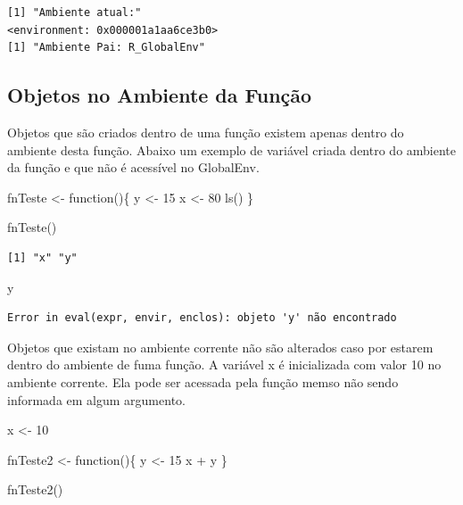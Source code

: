 \documentclass[
  letterpaper,
  DIV=11,
  numbers=noendperiod]{scrreprt}
\newenvironment{Shaded}{\begin{snugshade}}{\end{snugshade}}
\newcommand{\ControlFlowTok}[1]{\textcolor[rgb]{0.00,0.23,0.31}{#1}}
\newcommand{\DecValTok}[1]{\textcolor[rgb]{0.68,0.00,0.00}{#1}}
\newcommand{\FunctionTok}[1]{\textcolor[rgb]{0.28,0.35,0.67}{#1}}
\newcommand{\NormalTok}[1]{\textcolor[rgb]{0.00,0.23,0.31}{#1}}
\newcommand{\OtherTok}[1]{\textcolor[rgb]{0.00,0.23,0.31}{#1}}
\newcommand{\SpecialCharTok}[1]{\textcolor[rgb]{0.37,0.37,0.37}{#1}}
\begin{document}
\begin{verbatim}
[1] "Ambiente atual:"
<environment: 0x000001a1aa6ce3b0>
[1] "Ambiente Pai: R_GlobalEnv"
\end{verbatim}

\hypertarget{objetos-no-ambiente-da-funuxe7uxe3o}{%
\subsection{Objetos no Ambiente da
Função}\label{objetos-no-ambiente-da-funuxe7uxe3o}}

Objetos que são criados dentro de uma função existem apenas dentro do
ambiente desta função. Abaixo um exemplo de variável criada dentro do
ambiente da função e que não é acessível no GlobalEnv.

\begin{Shaded}
\begin{Highlighting}[]
\NormalTok{fnTeste }\OtherTok{\textless{}{-}} \ControlFlowTok{function}\NormalTok{()\{}
\NormalTok{  y }\OtherTok{\textless{}{-}} \DecValTok{15}
\NormalTok{  x }\OtherTok{\textless{}{-}} \DecValTok{80}
  \FunctionTok{ls}\NormalTok{()}
\NormalTok{\}}

\FunctionTok{fnTeste}\NormalTok{()}
\end{Highlighting}
\end{Shaded}

\begin{verbatim}
[1] "x" "y"
\end{verbatim}

\begin{Shaded}
\begin{Highlighting}[]
\NormalTok{y}
\end{Highlighting}
\end{Shaded}

\begin{verbatim}
Error in eval(expr, envir, enclos): objeto 'y' não encontrado
\end{verbatim}

Objetos que existam no ambiente corrente não são alterados caso por
estarem dentro do ambiente de fuma função. A variável x é inicializada
com valor 10 no ambiente corrente. Ela pode ser acessada pela função
memso não sendo informada em algum argumento.

\begin{Shaded}
\begin{Highlighting}[]
\NormalTok{x }\OtherTok{\textless{}{-}} \DecValTok{10}

\NormalTok{fnTeste2 }\OtherTok{\textless{}{-}} \ControlFlowTok{function}\NormalTok{()\{}
\NormalTok{  y }\OtherTok{\textless{}{-}} \DecValTok{15}
\NormalTok{  x }\SpecialCharTok{+}\NormalTok{ y}
\NormalTok{\}}

\FunctionTok{fnTeste2}\NormalTok{()}
\end{Highlighting}
\end{Shaded}
\end{document}
